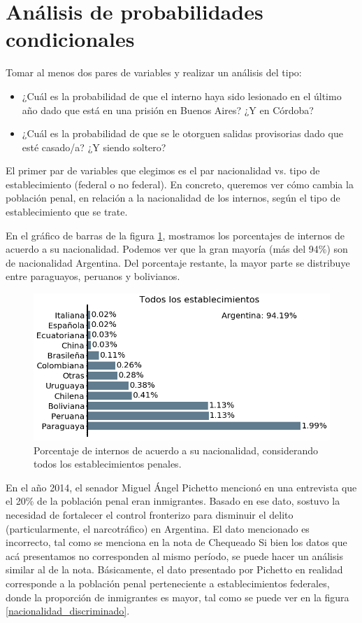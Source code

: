\documentclass[10pt]{article}
\begin{document}
\section{Análisis de probabilidades condicionales}

Tomar al menos dos pares de variables y realizar un análisis del tipo:

\begin{itemize}
	\item ¿Cuál es la probabilidad de que el interno haya sido lesionado en el último año dado que está en una prisión en Buenos Aires? ¿Y en Córdoba?
	\item ¿Cuál es la probabilidad de que se le otorguen salidas provisorias dado que esté casado/a? ¿Y siendo soltero?
\end{itemize}

El primer par de variables que elegimos es el par nacionalidad vs. tipo de establecimiento (federal o no federal). En concreto, queremos ver c\'omo cambia la poblaci\'on penal, en relaci\'on a la nacionalidad de los internos, seg\'un el tipo de establecimiento que se trate. 

En el gr\'afico de barras de la figura \ref{fig:nacionalidad_todos}, mostramos los porcentajes de internos de acuerdo a su nacionalidad. Podemos ver que la gran mayor\'ia (m\'as del 94\%) son de nacionalidad Argentina. Del porcentaje restante, la mayor parte se distribuye entre paraguayos, peruanos y bolivianos.

\begin{figure}[H]
	\centering
\includegraphics[scale=0.40]{graficos/nacionalidad_bar.png}
	\caption{Porcentaje de internos de acuerdo a su nacionalidad, considerando todos los establecimientos penales.\label{fig:nacionalidad_todos}}
\end{figure}

En el a\~no 2014, el senador Miguel \'Angel Pichetto mencion\'o en una entrevista que el 20\% de la poblaci\'on penal eran inmigrantes. Basado en ese dato, sostuvo la necesidad de fortalecer el control fronterizo para disminuir el delito (particularmente, el narcotr\'afico) en Argentina. El dato mencionado es incorrecto, tal como se menciona en la nota de Chequeado \cite{chequeadoInmigrantes} Si bien los datos que ac\'a presentamos no corresponden al mismo per\'iodo, se puede hacer un an\'alisis similar al de la nota. B\'asicamente, el dato presentado por Pichetto en realidad corresponde a la poblaci\'on penal perteneciente a establecimientos federales, donde la proporci\'on de inmigrantes es mayor, tal como se puede ver en la figura \ref{nacionalidad_discriminado}. 
\end{document}
